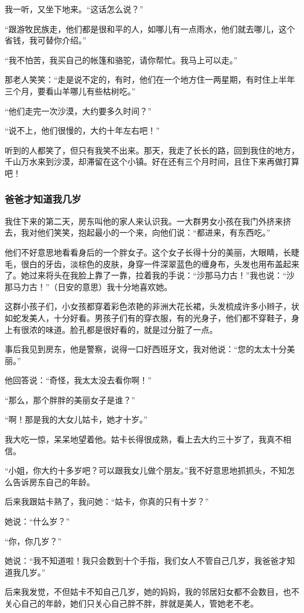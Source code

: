 \par 我一听，又坐下地来。“这话怎么说？”
\par “跟游牧民族走，他们都是很和平的人，如哪儿有一点雨水，他们就去哪儿，这个省钱，我可替你介绍。”
\par “我不怕苦，我买自己的帐篷和骆驼，请你帮忙。我马上可以走。”
\par 那老人笑笑：“走是说不定的，有时，他们在一个地方住一两星期，有时住上半年三个月，要看山羊哪儿有些枯树吃。”
\par “他们走完一次沙漠，大约要多久时间？”
\par “说不上，他们很慢的，大约十年左右吧！”
\par 听到的人都笑了，但只有我笑不出来。那天，我走了长长的路，回到我住的地方，千山万水来到沙漠，却滞留在这个小镇。好在还有三个月时间，且住下来再做打算吧！
\subsubsection*{爸爸才知道我几岁}
\par 我住下来的第二天，房东叫他的家人来认识我。一大群男女小孩在我门外挤来挤去，我对他们笑笑，抱起最小的一个来，向他们说：“都进来，有东西吃。”
\par 他们不好意思地看看身后的一个胖女子。这个女子长得十分的美丽，大眼睛，长睫毛，很白的牙齿，淡棕色的皮肤，身穿一件深翠蓝色的缠身布，头发也用布盖起来了。她过来将头在我脸上靠了一靠，拉着我的手说：“沙那马力古！”我也说：“沙那马力古！”（日安的意思）我十分地喜欢她。
\par 这群小孩子们，小女孩都穿着彩色浓艳的非洲大花长裙，头发梳成许多小辫子，状如蛇发美人，十分好看。男孩子们有的穿衣服，有的光身子，他们都不穿鞋子，身上有很浓的味道。脸孔都是很好看的，就是过分脏了一点。
\par 事后我见到房东，他是警察，说得一口好西班牙文，我对他说：“您的太太十分美丽。”
\par 他回答说：“奇怪，我太太没去看你啊！”
\par “那么，那个胖胖的美丽女子是谁？”
\par “啊！那是我的大女儿姑卡，她才十岁。”
\par 我大吃一惊，呆呆地望着他。姑卡长得很成熟，看上去大约三十岁了，我真不相信。
\par “小姐，你大约十多岁吧？可以跟我女儿做个朋友。”我不好意思地抓抓头，不知怎么告诉房东自己的年龄。
\par 后来我跟姑卡熟了，我问她：“姑卡，你真的只有十岁？”
\par 她说：“什么岁？”
\par “你，你几岁？”
\par 她说：“我不知道啦！我只会数到十个手指，我们女人不管自己几岁，我爸爸才知道我几岁。”
\par 后来我发觉，不但姑卡不知自己几岁，她的妈妈，我的邻居妇女都不会数目，也不关心自己的年龄，她们只关心自己胖不胖，胖就是美人，管她老不老。
